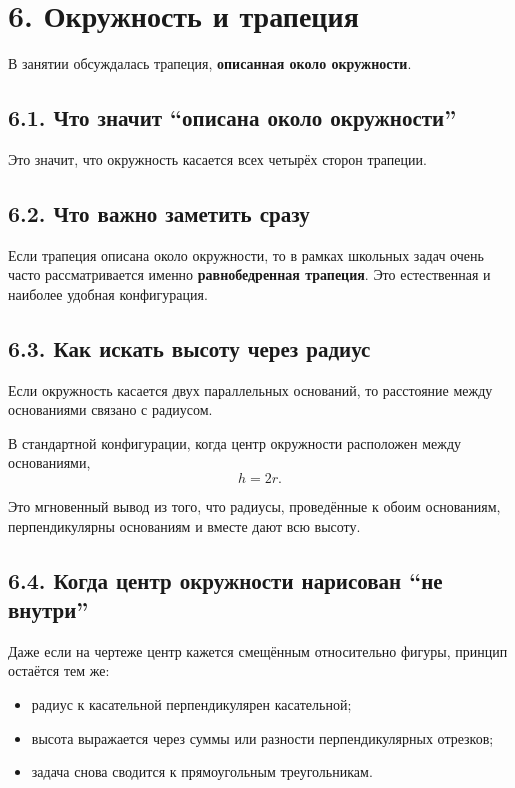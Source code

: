 \documentclass[a4paper,12pt]{article}
\begin{document}
\section*{\textcolor{darkaccent}{6. Окружность и трапеция}}

В занятии обсуждалась трапеция, \textbf{описанная около окружности}.

\subsection*{\textcolor{accent}{6.1. Что значит ``описана около окружности''}}
Это значит, что окружность касается всех четырёх сторон трапеции.

\subsection*{\textcolor{accent}{6.2. Что важно заметить сразу}}
Если трапеция описана около окружности, то в рамках школьных задач очень часто рассматривается именно \textbf{равнобедренная трапеция}. Это естественная и наиболее удобная конфигурация.

\subsection*{\textcolor{accent}{6.3. Как искать высоту через радиус}}
Если окружность касается двух параллельных оснований, то расстояние между основаниями связано с радиусом.

В стандартной конфигурации, когда центр окружности расположен между основаниями,
\[
h=2r.
\]

Это мгновенный вывод из того, что радиусы, проведённые к обоим основаниям, перпендикулярны основаниям и вместе дают всю высоту.

\subsection*{\textcolor{accent}{6.4. Когда центр окружности нарисован ``не внутри''}}
Даже если на чертеже центр кажется смещённым относительно фигуры, принцип остаётся тем же:
\begin{itemize}
    \item радиус к касательной перпендикулярен касательной;
    \item высота выражается через суммы или разности перпендикулярных отрезков;
    \item задача снова сводится к прямоугольным треугольникам.
\end{itemize}
\end{document}
